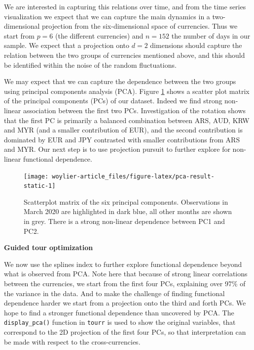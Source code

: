 We are interested in capturing this relations over time, and from the time series visualization we expect that we can capture the main dynamics in a two-dimensional projection from the six-dimensional space of currencies. Thus we start from \(p=6\) (the different currencies) and \(n=152\) the number of days in our sample. We expect that a projection onto \(d=2\) dimensions should capture the relation between the two groups of currencies mentioned above, and this should be identified within the noise of the random fluctuations.

We may expect that we can capture the dependence between the two groups using principal components analysis (PCA). Figure \ref{fig:pca-result-static} shows a scatter plot matrix of the principal components (PCs) of our dataset. Indeed we find strong non-linear association between the first two PCs. Investigation of the rotation shows that the first PC is primarily a balanced combination between ARS, AUD, KRW and MYR (and a smaller contribution of EUR), and the second contribution is dominated by EUR and JPY contrasted with smaller contributions from ARS and MYR. Our next step is to use projection pursuit to further explore for non-linear functional dependence.

\begin{figure}

{\centering \texttt{[image: woylier-article\_files/figure-latex/pca-result-static-1]} 

}

\caption{Scatterplot matrix of the six principal components. Observations in March 2020 are highlighted in dark blue, all other months are shown in grey. There is a strong non-linear dependence between PC1 and PC2.}\label{fig:pca-result-static}
\end{figure}

\textbf{Guided tour optimization}

We now use the splines index to further explore functional dependence beyond what is observed from PCA. Note here that because of strong linear correlations between the currencies, we start from the first four PCs, explaining over 97\% of the variance in the data. And to make the challenge of finding functional dependence harder we start from a projection onto the third and forth PCs. We hope to find a stronger functional dependence than uncovered by PCA. The \texttt{display\_pca()} function in \texttt{tourr} is used to show the original variables, that correspond to the 2D projection of the first four PCs, so that interpretation can be made with respect to the cross-currencies.

